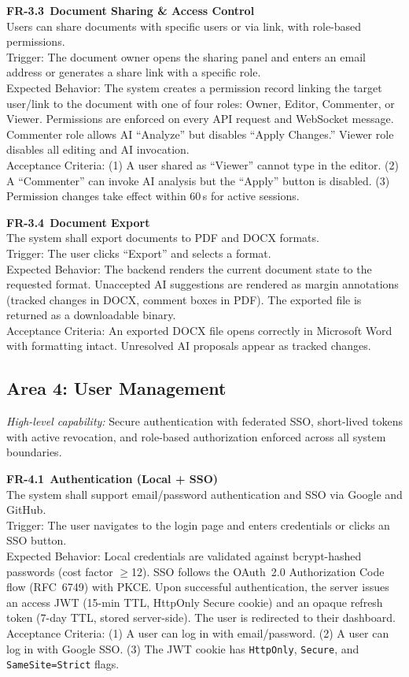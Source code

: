 \documentclass[10pt, a4paper]{article}
\newcommand{\requirement}[1]{\textcolor{accent}{\textsf{\textbf{#1}}}}
\newcommand{\lightrule}{{\color{border}\rule{\textwidth}{0.4pt}}}
\newcommand{\frcard}[6]{%
\vspace{4pt}
\noindent\begin{minipage}{\textwidth}
\noindent\requirement{#1}~\textbf{#2}\\[2pt]
{\small\color{inkSoft}#3}\\[3pt]
{\small\color{inkMuted}\textsf{Trigger:}} {\small #4}\\[1pt]
{\small\color{inkMuted}\textsf{Expected Behavior:}} {\small #5}\\[1pt]
{\small\color{inkMuted}\textsf{Acceptance Criteria:}} {\small #6}
\end{minipage}
\vspace{4pt}\lightrule\vspace{2pt}
}
\begin{document}
\frcard{FR-3.3}{Document Sharing \& Access Control}{Users can share documents with specific users or via link, with role-based permissions.}{The document owner opens the sharing panel and enters an email address or generates a share link with a specific role.}{The system creates a permission record linking the target user/link to the document with one of four roles: Owner, Editor, Commenter, or Viewer. Permissions are enforced on every API request and WebSocket message. Commenter role allows AI ``Analyze'' but disables ``Apply Changes.'' Viewer role disables all editing and AI invocation.}{(1) A user shared as ``Viewer'' cannot type in the editor. (2) A ``Commenter'' can invoke AI analysis but the ``Apply'' button is disabled. (3) Permission changes take effect within 60\,s for active sessions.}

\frcard{FR-3.4}{Document Export}{The system shall export documents to PDF and DOCX formats.}{The user clicks ``Export'' and selects a format.}{The backend renders the current document state to the requested format. Unaccepted AI suggestions are rendered as margin annotations (tracked changes in DOCX, comment boxes in PDF). The exported file is returned as a downloadable binary.}{An exported DOCX file opens correctly in Microsoft Word with formatting intact. Unresolved AI proposals appear as tracked changes.}

\subsection{Area 4: User Management}

{\small\textit{High-level capability:} Secure authentication with federated SSO, short-lived tokens with active revocation, and role-based authorization enforced across all system boundaries.}

\frcard{FR-4.1}{Authentication (Local + SSO)}{The system shall support email/password authentication and SSO via Google and GitHub.}{The user navigates to the login page and enters credentials or clicks an SSO button.}{Local credentials are validated against bcrypt-hashed passwords (cost factor $\ge$12). SSO follows the OAuth~2.0 Authorization Code flow (RFC~6749) with PKCE. Upon successful authentication, the server issues an access JWT (15-min TTL, HttpOnly Secure cookie) and an opaque refresh token (7-day TTL, stored server-side). The user is redirected to their dashboard.}{(1) A user can log in with email/password. (2) A user can log in with Google SSO. (3) The JWT cookie has \texttt{HttpOnly}, \texttt{Secure}, and \texttt{SameSite=Strict} flags.}
\end{document}
